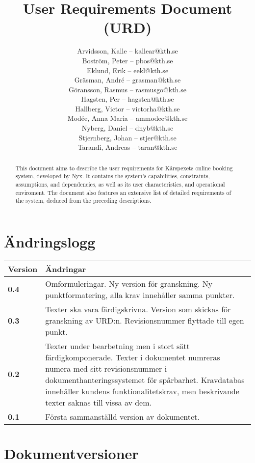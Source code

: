 \documentclass[a4paper, twoside, 11pt, titlepage]{article}
\author{
	\small
	Arvidsson, Kalle -- kallear@kth.se\\
	Boström, Peter -- pbos@kth.se\\
	Eklund, Erik -- eekl@kth.se\\
	Gräsman, André -- grasman@kth.se\\
	Göransson, Rasmus -- rasmusgo@kth.se\\
	Hagsten, Per -- hagsten@kth.se\\
	Hallberg, Victor -- victorha@kth.se\\
	Modée, Anna Maria -- ammodee@kth.se\\
	Nyberg, Daniel -- dnyb@kth.se\\
	Stjernberg, Johan -- stjer@kth.se\\
	Tarandi, Andreas -- taran@kth.se
	}
\title{User Requirements Document (URD)}
\begin{document}
\maketitle

\begin{abstract}
	This document aims to describe the user requirements for Kårspexets online booking system, developed by Nyx. It contains the system's capabilities, constraints, assumptions, and dependencies, as well as its user characteristics, and operational enviroment. The document also features an extensive list of detailed requirements of the system, deduced from the preceding descriptions.
\end{abstract}

\newpage

\tableofcontents

\clearpage
\setcounter{page}{1}

\startfooter

\clearpage
\section*{Ändringslogg}


\begin{tabular} { p{2.6cm} p{12.5cm} }
	\hline
	\sffamily\textbf{Version} & \sffamily\textbf{Ändringar } \\
	\hline
	\sffamily\textbf{0.4} & Omformuleringar. Ny version för granskning. Ny punktformatering, alla krav innehåller samma punkter.  \\
	\hline
	\sffamily\textbf{0.3} & Texter ska vara färdigskrivna. Version som skickas för granskning av URD:n. Revisionsnummer flyttade till egen punkt.  \\
	\hline
	\sffamily\textbf{0.2} & Texter under bearbetning men i stort sätt färdigkomponerade. Texter i dokumentet numreras numera med sitt revisionsnummer i dokumenthanteringssystemet för spårbarhet. Kravdatabas innehåller kundens funktionalitetskrav, men beskrivande texter saknas till vissa av dem.   \\
	\hline
	\sffamily\textbf{0.1} & Första sammanställd version av dokumentet.  \\
	\hline
\end{tabular}


\clearpage
\section*{Dokumentversioner}
\end{document}
